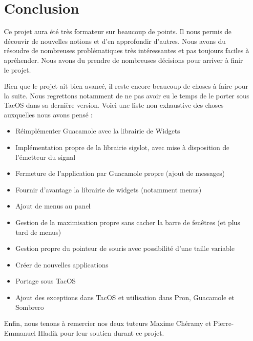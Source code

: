 \section{Conclusion}

Ce projet aura été très formateur sur beaucoup de points.
Il nous permis de découvir de nouvelles notions et d'en approfondir d'autres.
Nous avons du résoudre de nombreuses problématiques très intéressantes et pas toujours faciles à apréhender.
Nous avons du prendre de nombreuses décisions pour arriver à finir le projet.

Bien que le projet ait bien avancé, il reste encore beaucoup de choses à faire pour la suite.
Nous regrettons notamment de ne pas avoir eu le temps de le porter sous TacOS dans sa dernière version.
Voici une liste non exhaustive des choses auxquelles nous avons pensé :

\begin{itemize}
  \item Réimplémenter Guacamole avec la librairie de Widgets
  \item Implémentation propre de la librairie sigslot, avec mise à disposition de l'émetteur du signal
  \item Fermeture de l'application par Guacamole propre (ajout de messages)
  \item Fournir d'avantage la librairie de widgets (notamment menus)
  \item Ajout de menus au panel
  \item Gestion de la maximisation propre sans cacher la barre de fenêtres (et plus tard de menus)
  \item Gestion propre du pointeur de souris avec possibilité d'une taille variable
  \item Créer de nouvelles applications
  \item Portage sous TacOS
  \item Ajout des exceptions dans TacOS et utilisation dans Pron, Guacamole et Sombrero
\end{itemize}

Enfin, nous tenons à remercier nos deux tuteurs Maxime Chéramy et Pierre-Emmanuel Hladik pour leur soutien durant ce projet.
